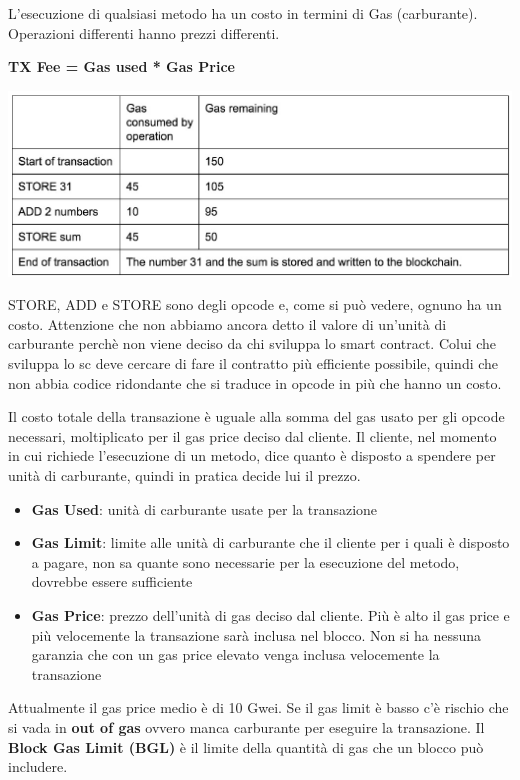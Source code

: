L'esecuzione di qualsiasi metodo ha un costo in termini di Gas (carburante). Operazioni differenti hanno prezzi differenti. 
\begin{center}
    \textbf{TX Fee = Gas used * Gas Price}
\end{center}

\begin{center}
    \includegraphics[scale=0.4]{Images/Blockchain/GasPrice.jpg}
\end{center}

STORE, ADD e STORE sono degli opcode e, come si può vedere, ognuno ha un costo. Attenzione che non abbiamo ancora detto il valore di un'unità di carburante perchè non viene deciso da chi sviluppa lo smart contract. Colui che sviluppa lo sc deve cercare di fare il contratto più efficiente possibile, quindi che non abbia codice ridondante che si traduce in opcode in più che hanno un costo. 

Il costo totale della transazione è uguale alla somma del gas usato per gli opcode necessari, moltiplicato per il gas price deciso dal cliente. Il cliente, nel momento in cui richiede l'esecuzione di un metodo, dice quanto è disposto a spendere per unità di carburante, quindi in pratica decide lui il prezzo. 
\begin{itemize}
    \item \textbf{Gas Used}: unità di carburante usate per la transazione
    \item \textbf{Gas Limit}: limite alle unità di carburante che il cliente per i quali è disposto a pagare, non sa quante sono necessarie per la esecuzione del metodo, dovrebbe essere sufficiente
    \item \textbf{Gas Price}: prezzo dell'unità di gas deciso dal cliente. Più è alto il gas price e più velocemente la transazione sarà inclusa nel blocco. Non si ha nessuna garanzia che con un gas price elevato venga inclusa velocemente la transazione
\end{itemize}

Attualmente il gas price medio è di 10 Gwei. Se il gas limit è basso c'è rischio che si vada in \textbf{out of gas} ovvero manca carburante per eseguire la transazione. Il \textbf{Block Gas Limit (BGL)} è il limite della quantità di gas che un blocco può includere. 

